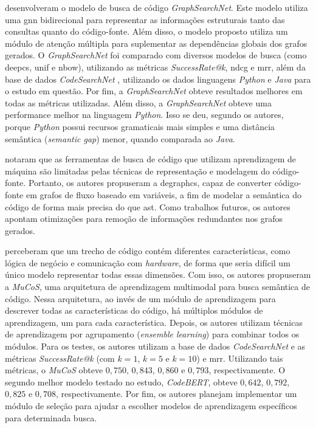 \textcite{Liu2021GraphSearchNetEG} desenvolveram o modelo de busca de código \textit{GraphSearchNet}. Este modelo utiliza uma \gls{gnn} bidirecional para representar as informações estruturais tanto das consultas quanto do código-fonte. Além disso, o modelo proposto utiliza um módulo de atenção múltipla para suplementar as dependências globais dos grafos gerados. O \textit{GraphSearchNet} foi comparado com diversos modelos de busca (como \gls{deepcs}, \gls{unif} e \gls{nbow}), utilizando as métricas \textit{SuccessRate@k}, \gls{ndcg} e \gls{mrr}, além da base de dados \textit{CodeSearchNet} \cite{Husain2019CodeSearchNetCE}, utilizando os dados linguagens \textit{Python} e \textit{Java} para o estudo em questão. Por fim, a \textit{GraphSearchNet} obteve resultados melhores em todas as métricas utilizadas. Além disso, a \textit{GraphSearchNet} obteve uma performance melhor na linguagem \textit{Python}. Isso se deu, segundo os autores, porque \textit{Python} possui recursos gramaticais mais simples e uma distância semântica (\textit{semantic gap}) menor, quando comparada ao \textit{Java}.

\textcite{Zeng2021deGraphCSEV} notaram que as ferramentas de busca de código que utilizam aprendizagem de máquina são limitadas pelas técnicas de representação e modelagem do código-fonte. Portanto, os autores propuseram a \gls{degraphcs}, capaz de converter código-fonte em grafos de fluxo baseado em variáveis, a fim de modelar a semântica do código de forma mais precisa do que \gls{ast}. Como trabalhos futuros, os autores apontam otimizações para remoção de informações redundantes nos grafos gerados.

\textcite{Du2021IsAS} perceberam que um trecho de código contém diferentes características, como lógica de negócio e comunicação com \textit{hardware}, de forma que seria difícil um único modelo representar todas essas dimensões. Com isso, os autores propuseram a \textit{MuCoS}, uma arquitetura de aprendizagem multimodal para busca semântica de código. Nessa arquitetura, ao invés de um módulo de aprendizagem para descrever todas as características do código, há múltiplos módulos de aprendizagem, um para cada característica. Depois, os autores utilizam técnicas de aprendizagem por agrupamento (\textit{ensemble learning}) para combinar todos os módulos. Para os testes, os autores utilizam a base de dados \textit{CodeSearchNet} \cite{Husain2019CodeSearchNetCE} e as métricas \textit{SuccessRate@k} (com $k=1$, $k=5$ e $k=10$) e \gls{mrr}. Utilizando tais métricas, o \textit{MuCoS} obteve $0,750$, $0,843$, $0,860$ e $0,793$, respectivamente. O segundo melhor modelo testado no estudo, \textit{CodeBERT}, obteve $0,642$, $0,792$, $0,825$ e $0,708$, respectivamente. Por fim, os autores planejam implementar um módulo de seleção para ajudar a escolher modelos de aprendizagem específicos para determinada busca.

